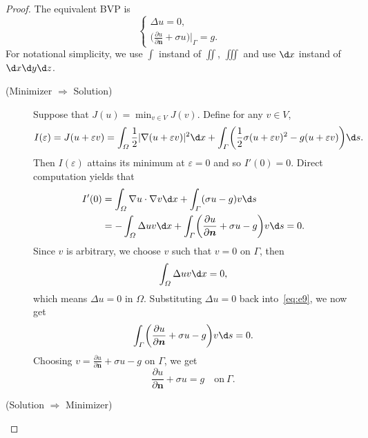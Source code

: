 \begin{proof}
  The equivalent BVP is
  \[\begin{cases}
    \Delta u = 0, \\
    \bigl(\frac{\partial u}{\partial \bm{n}} + \sigma u\bigr)\big|_{\varGamma} = g.
  \end{cases}\]
  For notational simplicity, we use $\int$ instand of $\iint$, $\iiint$ and use $\d x$
  instand of $\d x\d y\d z$.
  \begin{description}
    \item[(Minimizer $\Rightarrow$ Solution)]
      Suppose that $J(u) = \min_{v\in V} J(v)$.
      Define for any $v\in V$,
      \begin{equation}\label{eq:e8}
        I(\varepsilon) = J(u+\varepsilon v)
          = \int_\varOmega \frac12 |\nabla(u+\varepsilon v)|^2 \d x
            + \int_\varGamma \biggl(\frac12 \sigma (u+\varepsilon v)^2 - g(u+\varepsilon v)\biggr) \d s.
      \end{equation}
      Then $I(\varepsilon)$ attains its minimum at $\varepsilon=0$ and so $I'(0)=0$.
      Direct computation yields that
      \begin{equation}\label{eq:e9}
        \begin{aligned}
          I'(0)
          & = \int_\varOmega \nabla u\cdot \nabla v \d x + \int_\varGamma (\sigma u-g)v \d s \\
          & = - \int_\varOmega \Delta u v \d x
              + \int_\varGamma \biggl(\frac{\partial u}{\partial \bm{n}} + \sigma u - g\biggr)v \d s = 0.
        \end{aligned}
      \end{equation}
      Since $v$ is arbitrary, we choose $v$ such that $v=0$ on $\varGamma$, then
      \begin{equation}\label{eq:e10}
        \int_\varOmega \Delta u v \d x = 0,
      \end{equation}
      which means $\Delta u = 0$ in $\varOmega$. Substituting $\Delta u = 0$ back into~\eqref{eq:e9},
      we now get
      \begin{equation}\label{eq:e11}
        \int_\varGamma \biggl(\frac{\partial u}{\partial \bm{n}} + \sigma u - g\biggr)v \d s = 0.
      \end{equation}
      Choosing $v = \frac{\partial u}{\partial \bm{n}} + \sigma u - g$ on $\varGamma$, we get
      \[ \frac{\partial u}{\partial \bm{n}} + \sigma u = g \quad \text{on}\ \varGamma. \]
    \item[(Solution $\Rightarrow$ Minimizer)]

\end{description}
\end{proof}
